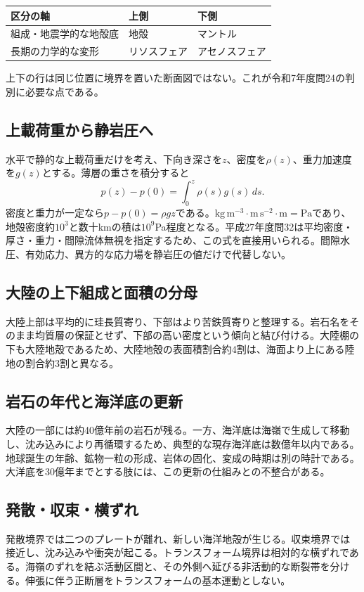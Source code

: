 \begin{center}
\begin{tabular}{lll}
\toprule
区分の軸 & 上側 & 下側 \\
\midrule
組成・地震学的な地殻底 & 地殻 & マントル \\
長期の力学的な変形 & リソスフェア & アセノスフェア \\
\bottomrule
\end{tabular}
\end{center}
上下の行は同じ位置に境界を置いた断面図ではない。これが令和7年度問24の判別に必要な点である。

\subsection{上載荷重から静岩圧へ}
\label{theory:interior:pressure}
水平で静的な上載荷重だけを考え、下向き深さを\(z\)、密度を\(\rho(z)\)、重力加速度を\(g(z)\)とする。薄層の重さを積分すると
\[
 p(z)-p(0)=\int_0^z\rho(s)g(s)\,ds.
\]
密度と重力が一定なら\(p-p(0)=\rho gz\)である。\(\mathrm{kg\,m^{-3}}\cdot\mathrm{m\,s^{-2}}\cdot\mathrm m=\mathrm{Pa}\)であり、地殻密度約\(10^3\)と数十kmの積は\(10^9\)Pa程度となる。平成27年度問32は平均密度・厚さ・重力・間隙流体無視を指定するため、この式を直接用いられる。間隙水圧、有効応力、異方的な応力場を静岩圧の値だけで代替しない。

\subsection{大陸の上下組成と面積の分母}
\label{theory:interior:continental}
大陸上部は平均的に珪長質寄り、下部はより苦鉄質寄りと整理する。岩石名をそのまま均質層の保証とせず、下部の高い密度という傾向と結び付ける。大陸棚の下も大陸地殻であるため、大陸地殻の表面積割合約4割は、海面より上にある陸地の割合約3割と異なる。\cite{umich_crust_teaching}

\subsection{岩石の年代と海洋底の更新}
\label{theory:interior:ages}
大陸の一部には約40億年前の岩石が残る。一方、海洋底は海嶺で生成して移動し、沈み込みにより再循環するため、典型的な現存海洋底は数億年以内である。地球誕生の年齢、鉱物一粒の形成、岩体の固化、変成の時期は別の時計である。大洋底を30億年までとする肢には、この更新の仕組みとの不整合がある。\cite{tokyo_crust_gallery,usgs_plate_boundaries}

\subsection{発散・収束・横ずれ}
\label{theory:interior:boundaries}
発散境界では二つのプレートが離れ、新しい海洋地殻が生じる。収束境界では接近し、沈み込みや衝突が起こる。トランスフォーム境界は相対的な横ずれである。海嶺のずれを結ぶ活動区間と、その外側へ延びる非活動的な断裂帯を分ける。伸張に伴う正断層をトランスフォームの基本運動としない。\cite{usgs_plate_boundaries}

